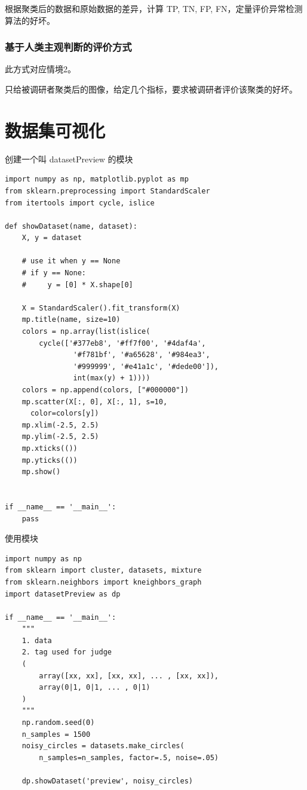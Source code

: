 \documentclass[UTF8]{ctexart}
\begin{document}
    根据聚类后的数据和原始数据的差异，计算 TP, TN, FP, FN，定量评价异常检测算法的好坏。

    \subsubsection{基于人类主观判断的评价方式}
    此方式对应情境2。

    只给被调研者聚类后的图像，给定几个指标，要求被调研者评价该聚类的好坏。

\section{数据集可视化}
创建一个叫 datasetPreview 的模块
\begin{lstlisting}[style=stylePy]
import numpy as np, matplotlib.pyplot as mp
from sklearn.preprocessing import StandardScaler
from itertools import cycle, islice

def showDataset(name, dataset):
    X, y = dataset

    # use it when y == None
    # if y == None:
    #     y = [0] * X.shape[0]

    X = StandardScaler().fit_transform(X)
    mp.title(name, size=10)
    colors = np.array(list(islice(
        cycle(['#377eb8', '#ff7f00', '#4daf4a',
                '#f781bf', '#a65628', '#984ea3',
                '#999999', '#e41a1c', '#dede00']),
                int(max(y) + 1))))
    colors = np.append(colors, ["#000000"]) 
    mp.scatter(X[:, 0], X[:, 1], s=10, 
      color=colors[y])
    mp.xlim(-2.5, 2.5)
    mp.ylim(-2.5, 2.5)
    mp.xticks(())
    mp.yticks(())
    mp.show()


if __name__ == '__main__':
    pass
\end{lstlisting}

使用模块
\begin{lstlisting}[style=stylePy]
import numpy as np
from sklearn import cluster, datasets, mixture
from sklearn.neighbors import kneighbors_graph
import datasetPreview as dp

if __name__ == '__main__':
    """
    1. data
    2. tag used for judge
    (
        array([xx, xx], [xx, xx], ... , [xx, xx]),  
        array(0|1, 0|1, ... , 0|1)                  
    )
    """
    np.random.seed(0)  
    n_samples = 1500
    noisy_circles = datasets.make_circles(
        n_samples=n_samples, factor=.5, noise=.05)

    dp.showDataset('preview', noisy_circles)
\end{lstlisting}
\end{document}
